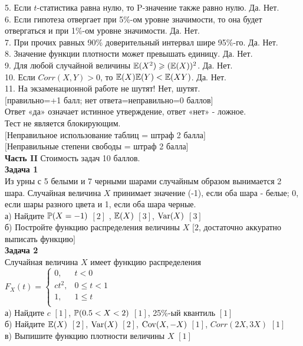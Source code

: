 \documentclass[12pt, a4paper]{article}\usepackage[]{graphicx}\usepackage[]{color}
\begin{document}
5. Если $t$-статистика равна нулю, то P-значение также равно
нулю. Да. Нет. \\

6. Если гипотеза отвергает при 5\%-ом уровне значимости, то
она будет отвергаться и при 1\%-ом уровне значимости. Да. Нет. \\

7. При прочих равных 90\% доверительный интервал шире 95\%-го. Да. Нет. \\

8. Значение функции плотности может превышать единицу. Да. Нет. \\

9. Для любой случайной величины  $\E(X^{2} )\ge
(\E(X))^{2}$. Да. Нет. \\

10. Если $Corr(X,Y)>0$, то $\E(X)\E(Y)<\E(XY)$. Да. Нет. \\

11. На экзаменационной работе не шутят! Нет, шутят. \\


$[$правильно=+1 балл; нет ответа=неправильно=0 баллов$]$ \\
Ответ «да» означает истинное утверждение, ответ «нет» - ложное. \\
Тест не является блокирующим. \\

$[$Неправильное использование таблиц = штраф 2 балла$]$ \\
$[$Неправильные степени свободы = штраф 2 балла$]$ \\

\textbf{Часть II} Стоимость задач 10 баллов. \\


\textbf{Задача 1} \\ %
Из урны с 5 белыми и 7 черными шарами случайным образом вынимается
2 шара. Случайная величина $X$ принимает значение (-1), если оба
шара - белые; 0, если шары разного цвета и 1, если оба шара
черные. \\
а) Найдите $\P(X=-1)$ $[2]$ , $\E(X)$ $[3]$, $\Var(X)$ $[3]$ \\
б) Постройте функцию распределения величины $X$ $[2$, достаточно аккуратно выписать функцию$]$ \\



\textbf{Задача 2} \\ %
Случайная величина $X$ имеет функцию распределения
$F_{X}(t)=\left\{\begin{array}{ll}
  0, & t<0 \\
  ct^{2}, & 0\le t <1 \\
  1, & 1\le t \\
\end{array} \right.$ \\
а) Найдите $c$ $[1]$, $\P(0.5<X<2)$ $[1]$, 25\%-ый квантиль $[1]$ \\
б) Найдите $\E(X)$ $[2]$, $\Var(X)$ $[2]$, $\Cov(X,-X)$ $[1]$, $Corr(2X,3X)$ $[1]$ \\
в) Выпишите функцию плотности величины $X$ $[1]$ \\
\end{document}
